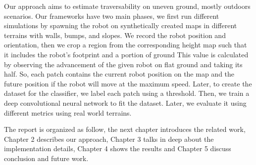 \documentclass[../document.tex]{subfiles}
\begin{document}
Our approach aims to estimate traversability on uneven ground, mostly outdoors scenarios. Our frameworks have two main phases, we first run different simulations by spawning the robot on synthetically
created maps in different terrains with walls, bumps, and slopes. We record the robot position and orientation, then we crop a region from the corresponding height map such that it includes the robot's footprint and a portion of ground This value is calculated by observing the advancement of the given robot on flat ground and taking its half. So, each patch contains the current robot position on the map and the future position if the robot will move at the maximum speed. Later, to create the dataset for the classifier, we label each patch using a threshold. Then, we train a deep convolutional neural network to fit the dataset. Later, we evaluate it using different metrics using real world terrains.

The report is organized as follow, the next chapter introduces the related work, Chapter 2 describes our approach, Chapter 3 talks in deep about the implementation details,
Chapter 4 shows the results and Chapter 5 discuss conclusion and future work.
\end{document}
